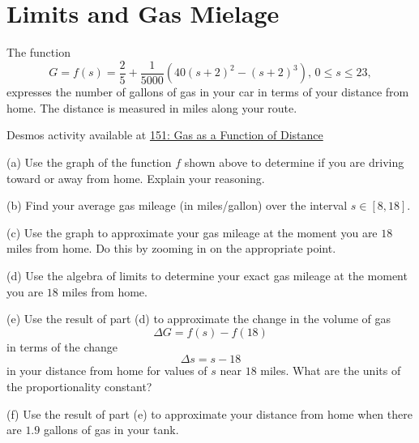\documentclass{ximera}
\begin{document}
\section{Limits and Gas Mielage}
\begin{example} \label{Ex:9sd8gfs}
The function 
\[
   G = f(s) = \frac{2}{5} +\frac{1}{5000}(40(s+2)^2 - (s+2)^3) , \, 0\leq s \leq 23 ,
\]
expresses the number of gallons of gas in your car in terms of your distance from home. The distance is measured in miles along your route. 

\begin{onlineOnly}
    \begin{center}
\end{center}
\end{onlineOnly}

Desmos activity available at
\href{https://www.desmos.com/calculator/ndpieuhgfa}{151: Gas as a Function of Distance}


(a) Use the graph of the function $f$ shown above to determine if you are driving toward or away from home. Explain your reasoning.

(b) Find your average gas mileage (in miles/gallon) over the interval $s \in [8,18]$.

(c) Use the graph to approximate your gas mileage at the moment you are $18$ miles from home. Do this by zooming in on the appropriate point.

(d) Use the algebra of limits to determine your exact gas mileage at the moment you are $18$ miles from home.




(e) Use the result of part (d) to approximate the change in the volume of gas
\[
    \Delta G = f(s)-f(18)
\]
in terms of the change
\[
   \Delta s = s - 18
\]
in your distance from home for values of $s$ near $18$ miles. What are the units of the proportionality constant?

(f) Use the result of part (e) to approximate your distance from home when there are $1.9$ gallons of gas in your tank.



\end{example}
\end{document}
